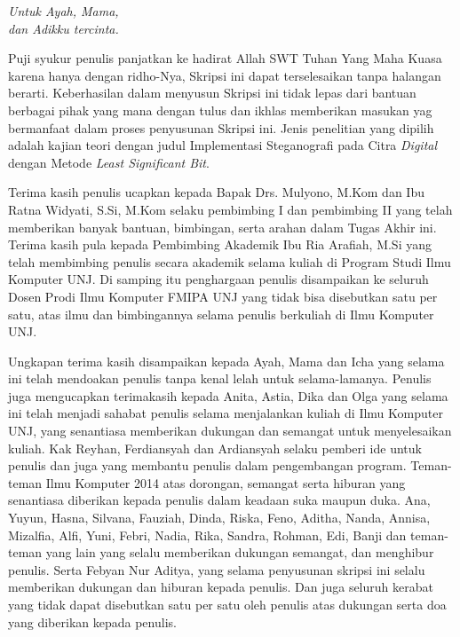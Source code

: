 \documentclass{jtetiskripsi}
\begin{document}
\cover




\acknowledgment
\begin{flushright}
	\emph{Untuk Ayah, Mama,\\dan Adikku tercinta.}
\end{flushright}
\preface

Puji syukur penulis panjatkan ke hadirat Allah SWT Tuhan Yang Maha Kuasa karena hanya dengan ridho-Nya, Skripsi ini dapat terselesaikan tanpa halangan berarti. Keberhasilan dalam menyusun Skripsi ini tidak lepas dari bantuan berbagai pihak yang mana dengan tulus dan ikhlas memberikan masukan yag bermanfaat dalam proses penyusunan Skripsi ini. Jenis penelitian yang dipilih adalah kajian teori dengan judul Implementasi Steganografi pada Citra \emph{Digital} dengan Metode \emph{Least Significant Bit}.

Terima kasih penulis ucapkan kepada Bapak Drs. Mulyono, M.Kom dan Ibu Ratna Widyati, S.Si, M.Kom selaku pembimbing I dan pembimbing II yang telah memberikan banyak bantuan, bimbingan, serta arahan dalam Tugas Akhir ini. Terima kasih pula kepada Pembimbing Akademik Ibu Ria Arafiah, M.Si yang telah membimbing penulis secara akademik selama kuliah di Program Studi Ilmu Komputer UNJ. Di samping itu penghargaan penulis disampaikan ke seluruh Dosen Prodi Ilmu Komputer FMIPA UNJ yang tidak bisa disebutkan satu per satu, atas ilmu dan bimbingannya selama penulis berkuliah di Ilmu Komputer UNJ. 

Ungkapan terima kasih disampaikan kepada Ayah, Mama dan Icha yang selama ini telah mendoakan penulis tanpa kenal lelah untuk selama-lamanya. Penulis juga mengucapkan terimakasih kepada Anita, Astia, Dika dan Olga yang selama ini telah menjadi sahabat penulis selama menjalankan kuliah di Ilmu Komputer UNJ, yang senantiasa memberikan dukungan dan semangat untuk menyelesaikan kuliah. Kak Reyhan, Ferdiansyah dan Ardiansyah selaku pemberi ide untuk penulis dan juga yang membantu penulis dalam pengembangan program. Teman-teman Ilmu Komputer 2014 atas dorongan, semangat serta hiburan yang senantiasa diberikan kepada penulis dalam keadaan suka maupun duka. Ana, Yuyun, Hasna, Silvana, Fauziah, Dinda, Riska, Feno, Aditha, Nanda, Annisa, Mizalfia, Alfi, Yuni, Febri, Nadia, Rika, Sandra, Rohman, Edi, Banji dan teman-teman yang lain yang selalu memberikan dukungan semangat, dan menghibur penulis. Serta Febyan Nur Aditya, yang selama penyusunan skripsi ini selalu memberikan dukungan dan hiburan kepada penulis. Dan juga seluruh kerabat yang tidak dapat disebutkan satu per satu oleh penulis atas dukungan serta doa yang diberikan kepada penulis.
\end{document}
